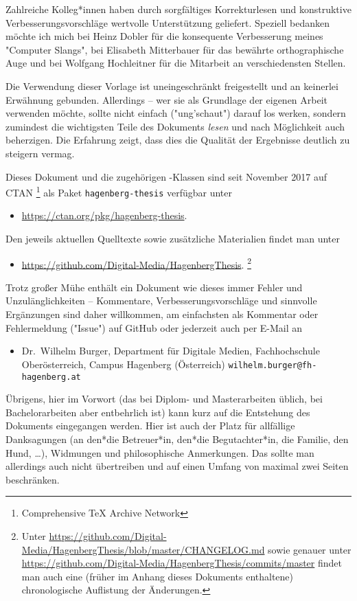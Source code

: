 Zahlreiche Kolleg*innen haben durch sorgfältiges Korrekturlesen und
konstruktive Verbesserungsvorschläge wertvolle Unterstützung
geliefert. Speziell bedanken möchte ich mich bei Heinz Dobler für
die konsequente Verbesserung meines "Computer Slangs", bei
Elisabeth Mitterbauer für das bewährte orthographische Auge und
bei Wolfgang Hochleitner für die Mitarbeit an verschiedensten Stellen.

Die Verwendung dieser Vorlage ist uneingeschränkt freigestellt und an
keinerlei Erwähnung gebunden. Allerdings -- wer sie als Grundlage
der eigenen Arbeit verwenden möchte, sollte nicht einfach
("ung'schaut") darauf los werken, sondern zumindest die
wichtigsten Teile des Dokuments \emph{lesen} und nach Möglichkeit
auch beherzigen. Die Erfahrung zeigt, dass dies die Qualität der
Ergebnisse deutlich zu steigern vermag.

Dieses Dokument und die zugehörigen \latex-Klassen sind seit November 2017 auf CTAN%
\footnote{Comprehensive TeX Archive Network} 
als Paket \texttt{hagenberg-thesis} verfügbar unter
%
\begin{itemize}
\item[]\url{https://ctan.org/pkg/hagenberg-thesis}.
\end{itemize}
%
Den jeweils aktuellen Quelltexte sowie zusätzliche Materialien findet man unter
%
\begin{itemize}
\item[]\url{https://github.com/Digital-Media/HagenbergThesis}.%
\footnote{Unter \url{https://github.com/Digital-Media/HagenbergThesis/blob/master/CHANGELOG.md}
sowie genauer unter \url{https://github.com/Digital-Media/HagenbergThesis/commits/master} 
findet man auch eine (früher im Anhang dieses Dokuments enthaltene) chronologische Auflistung der 
Änderungen.}
\end{itemize}



\noindent
Trotz großer Mühe enthält ein Dokument wie dieses immer Fehler und Unzulänglichkeiten
-- Kommentare, Verbesserungsvorschläge und sinnvolle Ergänzungen
sind daher willkommen, am einfachsten als Kommentar oder Fehlermeldung ("Issue") 
auf GitHub oder jederzeit auch per E-Mail an
%
\begin{itemize}
\item[]
Dr.\ Wilhelm Burger, Department für Digitale Medien,\newline
Fachhochschule Oberösterreich, Campus Hagenberg (Österreich)\newline
\nolinkurl{wilhelm.burger@fh-hagenberg.at}
\end{itemize}

\noindent
Übrigens, hier im Vorwort (das bei Diplom- und Masterarbeiten üblich, bei Bachelorarbeiten 
aber entbehrlich ist) kann kurz auf die Entstehung des Dokuments eingegangen werden.
Hier ist auch der Platz für allfällige Danksagungen (\zB an den*die Betreuer*in, 
den*die Begutachter*in, die Familie, den Hund, \ldots), Widmungen und philosophische 
Anmerkungen. Das sollte man allerdings auch nicht übertreiben und auf 
einen Umfang von maximal zwei Seiten beschränken.




